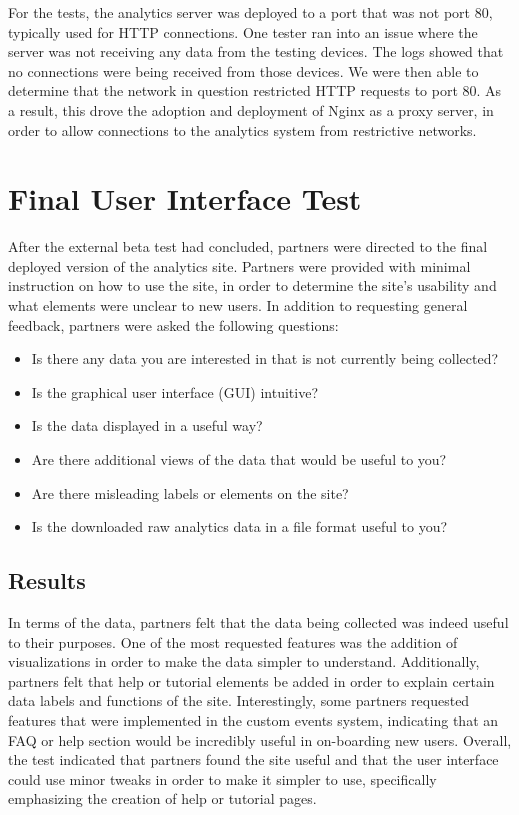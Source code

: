 For the tests, the analytics server was deployed to a port that was not port 80, typically used for HTTP connections. One tester ran into an issue where the server was not receiving any data from the testing devices. The logs showed that no connections were being received from those devices. We were then able to determine that the network in question restricted HTTP requests to port 80. As a result, this drove the adoption and deployment of Nginx as a proxy server, in order to allow connections to the analytics system from restrictive networks.

\section{Final User Interface Test}

After the external beta test had concluded, partners were directed to the final deployed version of the analytics site. Partners were provided with minimal instruction on how to use the site, in order to determine the site's usability and what elements were unclear to new users. In addition to requesting general feedback, partners were asked the following questions:

\begin{itemize}
	\item Is there any data you are interested in that is not currently being collected?
	\item Is the graphical user interface (GUI) intuitive? 
	\item Is the data displayed in a useful way? 
	\item Are there additional views of the data that would be useful to you?
	\item Are there misleading labels or elements on the site?
	\item Is the downloaded raw analytics data in a file format useful to you?
\end{itemize}

\subsection{Results}

In terms of the data, partners felt that the data being collected was indeed useful to their purposes. One of the most requested features was the addition of visualizations in order to make the data simpler to understand. Additionally, partners felt that help or tutorial elements be added in order to explain certain data labels and functions of the site. Interestingly, some partners requested features that were implemented in the custom events system, indicating that an FAQ or help section would be incredibly useful in on-boarding new users. Overall, the test indicated that partners found the site useful and that the user interface could use minor tweaks in order to make it simpler to use, specifically emphasizing the creation of help or tutorial pages.










